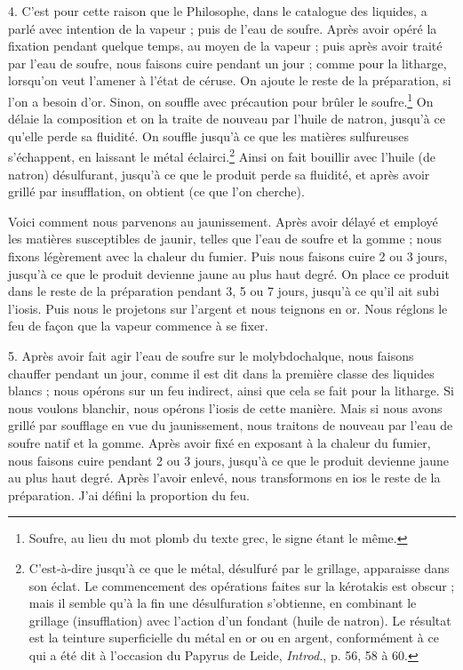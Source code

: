 \documentclass[a4paper, 11pt, oneside, polutonikogreek, french]{article}
\begin{document}
4. C'est pour cette raison que le Philosophe, dans le catalogue des liquides, a parlé avec intention de la vapeur ; puis de l'eau de soufre. Après avoir opéré la fixation pendant quelque temps, au moyen de la vapeur ; puis après avoir traité par l'eau de soufre, nous faisons cuire pendant un jour ; comme pour la litharge, lorsqu'on veut l'amener à l'état de céruse. On ajoute le reste de la préparation, si l'on a besoin d'or. Sinon, on souffle avec précaution pour brûler le soufre.\footnote{Soufre, au lieu du mot plomb du texte grec, le signe étant le même.} On délaie la composition et on la traite de nouveau par l'huile de natron, jusqu'à ce qu'elle perde sa fluidité. On souffle jusqu'à ce que les matières sulfureuses s'échappent, en laissant le métal éclairci.\footnote{C'est-à-dire jusqu'à ce que le métal, désulfuré par le grillage, apparaisse dans son éclat. Le commencement des opérations faites sur la kérotakis est obscur ; mais il semble qu'à la fin une désulfuration s'obtienne, en combinant le grillage (insufflation) avec l'action d'un fondant (huile de natron). Le résultat est la teinture superficielle du métal en or ou en argent, conformément à ce qui a été dit à l'occasion du Papyrus de Leide, \emph{Introd.}, p. 56, 58 à 60.} Ainsi on fait bouillir avec l'huile (de natron) désulfurant, jusqu'à ce que le produit perde sa fluidité, et après avoir grillé par insufflation, on obtient (ce que l'on cherche).

Voici comment nous parvenons au jaunissement. Après avoir délayé et employé les matières susceptibles de jaunir, telles que l'eau de soufre et la gomme ; nous fixons légèrement avec la chaleur du fumier. Puis nous faisons cuire 2 ou 3 jours, jusqu'à ce que le produit devienne jaune au plus haut degré. On place ce produit dans le reste de la préparation pendant 3, 5 ou 7 jours, jusqu'à ce qu'il ait subi l'iosis. Puis nous le projetons sur l'argent et nous teignons en or. Nous réglons le feu de façon que la vapeur commence à se fixer.

5. Après avoir fait agir l'eau de soufre sur le molybdochalque, nous faisons chauffer pendant un jour, comme il est dit dans la première classe des liquides blancs ; nous opérons sur un feu indirect, ainsi que cela se fait pour la litharge. Si nous voulons blanchir, nous opérons l'iosis de cette manière. Mais si nous avons grillé par soufflage en vue du jaunissement, nous traitons de nouveau par l'eau de soufre natif et la gomme. Après avoir fixé en exposant à la chaleur du fumier, nous faisons cuire pendant 2 ou 3 jours, jusqu'à ce que le produit devienne jaune au plus haut degré. Après l'avoir enlevé, nous transformons en ios le reste de la préparation. J'ai défini la proportion du feu.
\end{document}
